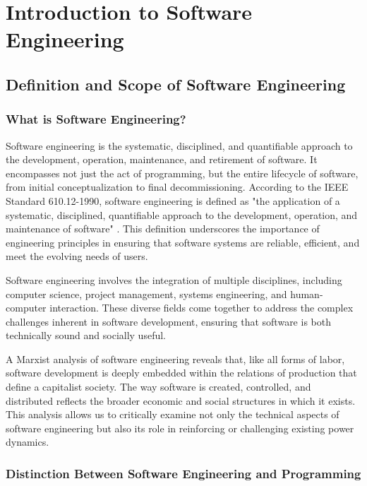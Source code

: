 \chapter{Introduction to Software Engineering}
\begin{refsection}
\section{Definition and Scope of Software Engineering}
\begin{multicols}{2}
{\small
\subsection{What is Software Engineering?}

Software engineering is the systematic, disciplined, and quantifiable approach to the development, operation, maintenance, and retirement of software. It encompasses not just the act of programming, but the entire lifecycle of software, from initial conceptualization to final decommissioning. According to the IEEE Standard 610.12-1990, software engineering is defined as "the application of a systematic, disciplined, quantifiable approach to the development, operation, and maintenance of software" \cite[p. 1]{ieee1990}. This definition underscores the importance of engineering principles in ensuring that software systems are reliable, efficient, and meet the evolving needs of users.

Software engineering involves the integration of multiple disciplines, including computer science, project management, systems engineering, and human-computer interaction. These diverse fields come together to address the complex challenges inherent in software development, ensuring that software is both technically sound and socially useful.

A Marxist analysis of software engineering reveals that, like all forms of labor, software development is deeply embedded within the relations of production that define a capitalist society. The way software is created, controlled, and distributed reflects the broader economic and social structures in which it exists. This analysis allows us to critically examine not only the technical aspects of software engineering but also its role in reinforcing or challenging existing power dynamics.

\subsection{Distinction Between Software Engineering and Programming}

}
\end{multicols}
\end{refsection}
